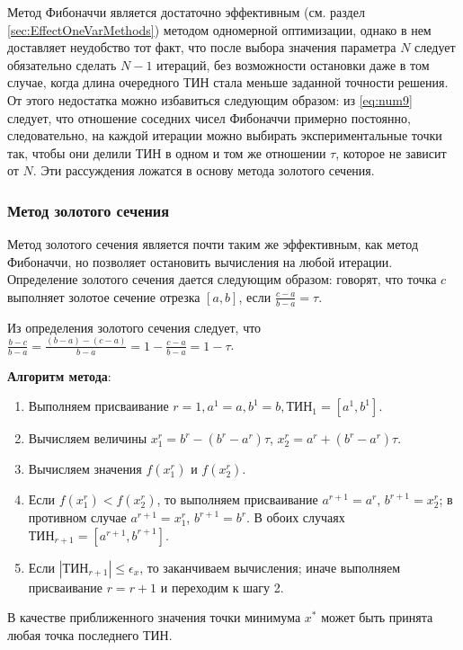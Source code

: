 \documentclass[a4paper,12pt]{report}
\begin{document}
Метод Фибоначчи является достаточно эффективным (см. раздел \ref{sec:EffectOneVarMethods}) методом одномерной оптимизации, однако в нем доставляет неудобство тот факт, что после выбора значения параметра $N$ следует обязательно сделать $N-1$ итераций, без возможности остановки даже в том случае, когда длина очередного ТИН стала меньше заданной точности решения. От этого недостатка можно избавиться следующим образом: из \eqref{eq:num9} следует, что отношение соседних чисел Фибоначчи примерно постоянно, следовательно, на каждой итерации можно выбирать экспериментальные точки так, чтобы они делили ТИН в одном и том же отношении $\tau$, которое не зависит от $N$. Эти рассуждения ложатся в основу метода золотого сечения.

\subsubsection{Метод золотого сечения}
Метод золотого сечения является почти таким же эффективным, как метод Фибоначчи, но позволяет остановить вычисления на любой итерации. Определение золотого сечения дается следующим образом: говорят, что точка $c$ выполняет золотое сечение отрезка $\left[a, b\right]$, если $\frac{c-a}{b-a} = \tau$.

Из определения золотого сечения следует, что $\frac{b-c}{b-a} = \frac{\left(b-a\right)-\left(c-a\right)}{b-a} = 1 -\frac{c-a}{b-a} = 1 - \tau$.

\textbf{Алгоритм метода}:
\begin{enumerate}
\item Выполняем присваивание $r = 1, a^{1} = a, b^{1} = b, \text{ТИН}_{1} = \left[a^{1}, b^{1}\right]$.
\item Вычисляем величины $x^{r}_{1} = b^{r} - \left(b^{r}-a^{r}\right)\tau$, $x^{r}_{2} = a^{r} + \left(b^{r}-a^{r}\right)\tau$.
\item Вычисляем значения $f(x^{r}_{1})$ и $f(x^{r}_{2})$.
\item Если $f(x^{r}_{1}) < f(x^{r}_{2})$, то выполняем присваивание $a^{r+1} = a^{r}$, $b^{r+1} = x^{r}_{2}$; в противном случае $a^{r+1} = x^{r}_{1}$, $b^{r+1} = b^{r}$. В обоих случаях $\text{ТИН}_{r+1} = \left[a^{r+1}, b^{r+1}\right]$.
\item Если $\left|\text{ТИН}_{r+1}\right| \leq \epsilon_{x}$, то заканчиваем вычисления; иначе выполняем присваивание $r = r + 1$ и переходим к шагу 2.
\end{enumerate}
В качестве приближенного значения точки минимума $x^{*}$ может быть принята любая точка последнего ТИН.
\end{document}
